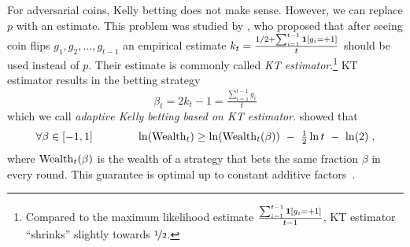 For adversarial coins, Kelly betting does not make sense. However, we can
replace $p$ with an estimate. This problem was studied by \citet{KrichevskyT81},
who proposed that after seeing coin flips $g_1, g_2, \dots, g_{t-1}$ an
empirical estimate $k_t = \frac{1/2 + \sum_{i=1}^{t-1} \mathbf{1}[g_i = +1]}{t}$
should be used instead of $p$. Their estimate is commonly called \emph{KT
estimator}.\footnote{Compared to the maximum likelihood estimate
$\frac{\sum_{i=1}^{t-1} \mathbf{1}[g_i = +1]}{t-1}$, KT estimator ``shrinks''
slightly towards $\nicefrac{1}{2}$.} KT estimator results in the betting strategy
\begin{equation}
\label{equation:kt-estimator-betting-strategy}
\beta_t = 2k_t - 1 = \tfrac{\sum_{i=1}^{t-1} g_i}{t}
\end{equation}
which we call \emph{adaptive Kelly betting based on KT estimator}.
\citeauthor{KrichevskyT81} showed that
$$
\forall \beta \in [-1,1] \qquad \qquad \ln(\Wealth_t) \ge \ln(\Wealth_t(\beta)) \ - \ \tfrac{1}{2} \ln t \ - \ \ln(2) \; ,
$$
where $\operatorname{Wealth}_t(\beta)$ is the wealth of a strategy that bets the same fraction
$\beta$ in every round. This guarantee is optimal up to constant additive factors~\citep{Cesa-BianchiL06}.
